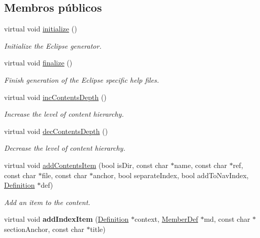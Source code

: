 \subsection*{Membros públicos}
\begin{DoxyCompactItemize}
\item 
virtual void \hyperlink{class_eclipse_help_a25a40b6614565f755233080a384c35f1}{initialize} ()
\begin{DoxyCompactList}\small\item\em Initialize the Eclipse generator. \end{DoxyCompactList}\item 
virtual void \hyperlink{class_eclipse_help_a32d626626eee0bc4ade146973f6abb1c}{finalize} ()
\begin{DoxyCompactList}\small\item\em Finish generation of the Eclipse specific help files. \end{DoxyCompactList}\item 
\hypertarget{class_eclipse_help_a96772b5eeae8044b3308f63fb040c253}{virtual void \hyperlink{class_eclipse_help_a96772b5eeae8044b3308f63fb040c253}{inc\-Contents\-Depth} ()}\label{class_eclipse_help_a96772b5eeae8044b3308f63fb040c253}

\begin{DoxyCompactList}\small\item\em Increase the level of content hierarchy. \end{DoxyCompactList}\item 
virtual void \hyperlink{class_eclipse_help_a3a6a2629dd91105d0048f0d0a9f7f983}{dec\-Contents\-Depth} ()
\begin{DoxyCompactList}\small\item\em Decrease the level of content hierarchy. \end{DoxyCompactList}\item 
virtual void \hyperlink{class_eclipse_help_a2037325cd2bf36b4a134b87dbb107a94}{add\-Contents\-Item} (bool is\-Dir, const char $\ast$name, const char $\ast$ref, const char $\ast$file, const char $\ast$anchor, bool separate\-Index, bool add\-To\-Nav\-Index, \hyperlink{class_definition}{Definition} $\ast$def)
\begin{DoxyCompactList}\small\item\em Add an item to the content. \end{DoxyCompactList}\item 
\hypertarget{class_eclipse_help_acae96bcfb2681e31a0e64854dd3809fe}{virtual void {\bfseries add\-Index\-Item} (\hyperlink{class_definition}{Definition} $\ast$context, \hyperlink{class_member_def}{Member\-Def} $\ast$md, const char $\ast$section\-Anchor, const char $\ast$title)}\label{class_eclipse_help_acae96bcfb2681e31a0e64854dd3809fe}


\end{DoxyCompactItemize}
